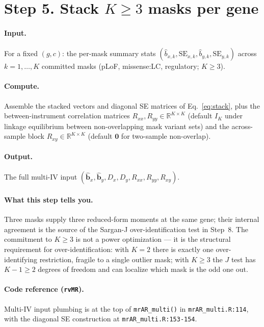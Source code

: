 \documentclass[11pt]{article}
\begin{document}
\section*{Step 5. Stack $K\ge 3$ masks per gene}

\paragraph{Input.} For a fixed $(g,c)$: the per-mask summary stats $(\hat b_{x,k},\mathrm{SE}_{x,k},\hat b_{y,k},\mathrm{SE}_{y,k})$ across $k=1,\dots,K$ committed masks (pLoF, missense:LC, regulatory; $K\ge 3$).

\paragraph{Compute.} Assemble the stacked vectors and diagonal SE matrices of Eq.~\eqref{eq:stack}, plus the between-instrument correlation matrices $R_{xx},R_{yy}\in\mathbb{R}^{K\times K}$ (default $I_K$ under linkage equilibrium between non-overlapping mask variant sets) and the across-sample block $R_{xy}\in\mathbb{R}^{K\times K}$ (default $\mathbf{0}$ for two-sample non-overlap).

\paragraph{Output.} The full multi-IV input $(\hat{\boldsymbol b}_x, \hat{\boldsymbol b}_y, D_x, D_y, R_{xx}, R_{yy}, R_{xy})$.

\paragraph{What this step tells you.} Three masks supply three reduced-form moments at the same gene; their internal agreement is the source of the Sargan-J over-identification test in Step~8. The commitment to $K\ge 3$ is not a power optimization --- it is the structural requirement for over-identification: with $K=2$ there is exactly one over-identifying restriction, fragile to a single outlier mask; with $K\ge 3$ the $J$ test has $K-1\ge 2$ degrees of freedom and can localize which mask is the odd one out.

\paragraph{Code reference (\texttt{rvMR}).} Multi-IV input plumbing is at the top of \verb|mrAR_multi()| in \verb|mrAR_multi.R:114|, with the diagonal SE construction at \verb|mrAR_multi.R:153-154|.
\end{document}
